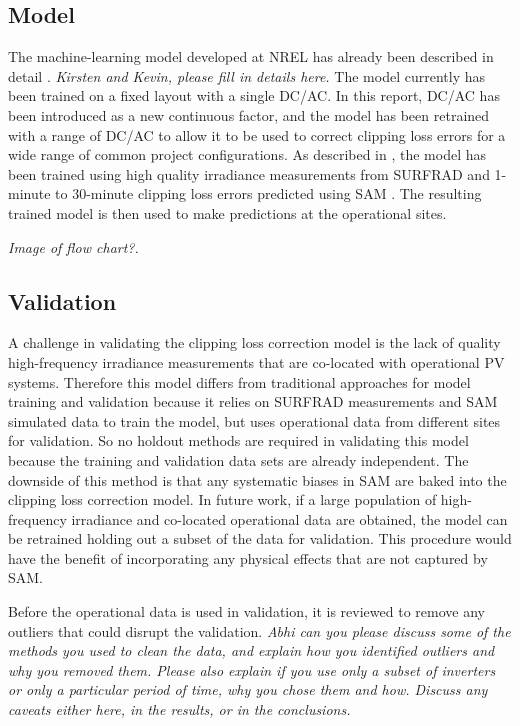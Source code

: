 \documentclass[conference]{IEEEtran}
\begin{document}
\subsection{Model}

The machine-learning model developed at NREL has already been described in detail \cite{Anderson2020}. \textit{\color{red}Kirsten and Kevin, please fill in details here.} The model currently has been trained on a fixed layout with a single DC/AC. In this report, DC/AC has been introduced as a new continuous factor, and the model has been retrained with a range of DC/AC to allow it to be used to correct clipping loss errors for a wide range of common project configurations. As described in \cite{Anderson2020}, the model has been trained using high quality irradiance measurements from SURFRAD \cite{Augustine2000} and 1-minute to 30-minute clipping loss errors predicted using SAM \cite{Freeman2018}. The resulting trained model is then used to make predictions at the operational sites.

\textit{\color{red}Image of flow chart?.}

\subsection{Validation}
A challenge in validating the clipping loss correction model is the lack of quality high-frequency irradiance measurements that are co-located with operational PV systems. Therefore this model differs from traditional approaches for model training and validation because it relies on SURFRAD measurements and SAM simulated data to train the model, but uses operational data from different sites for validation. So no holdout methods are required in validating this model because the training and validation data sets are already independent. The downside of this method is that any systematic biases in SAM are baked into the clipping loss correction model. In future work, if a large population of high-frequency irradiance and co-located operational data are obtained, the model can be retrained holding out a subset of the data for validation. This procedure would have the benefit of incorporating any physical effects that are not captured by SAM.

Before the operational data is used in validation, it is reviewed to remove any outliers that could disrupt the validation.  \textit{\color{red}Abhi can you please discuss some of the methods you used to clean the data, and explain how you identified outliers and why you removed them. Please also explain if you use only a subset of inverters or only a particular period of time, why you chose them and how. Discuss any caveats either here, in the results, or in the conclusions.}
\end{document}
